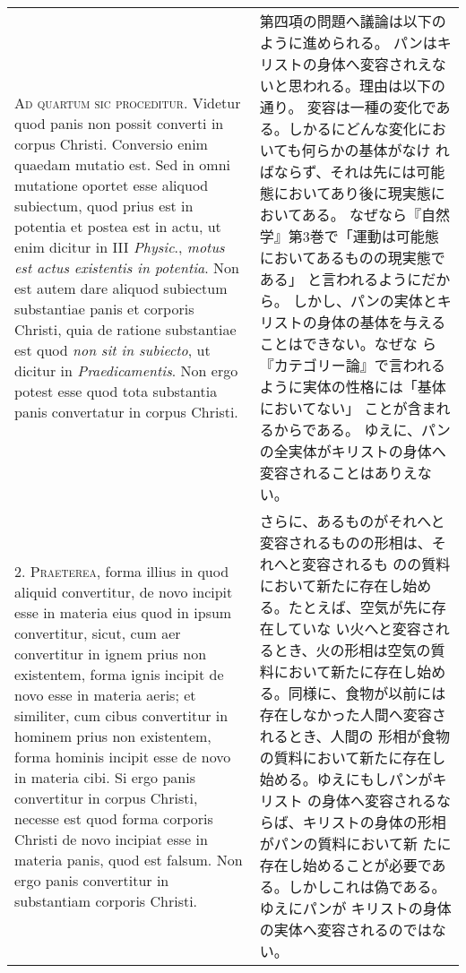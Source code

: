 \documentclass[10pt]{jsarticle} %
\begin{document}
\begin{longtable}{p{21em}p{21em}}

{\scshape Ad quartum sic proceditur}. Videtur quod panis non possit converti in
corpus Christi. Conversio enim quaedam mutatio est. Sed in omni
mutatione oportet esse aliquod subiectum, quod prius est in potentia
et postea est in actu, ut enim dicitur in III {\itshape Physic}., {\itshape motus est actus
existentis in potentia}. Non est autem dare aliquod subiectum
substantiae panis et corporis Christi, quia de ratione substantiae est
quod {\itshape non sit in subiecto}, ut dicitur in {\itshape Praedicamentis}. Non ergo
potest esse quod tota substantia panis convertatur in corpus Christi.

&

第四項の問題へ議論は以下のように進められる。
パンはキリストの身体へ変容されえないと思われる。理由は以下の通り。
変容は一種の変化である。しかるにどんな変化においても何らかの基体がなけ
 ればならず、それは先には可能態においてあり後に現実態においてある。
なぜなら『自然学』第3巻で「運動は可能態においてあるものの現実態である」
 と言われるようにだから。
しかし、パンの実体とキリストの身体の基体を与えることはできない。なぜな
 ら『カテゴリー論』で言われるように実体の性格には「基体においてない」
 ことが含まれるからである。
ゆえに、パンの全実体がキリストの身体へ変容されることはありえない。

\\

2. {\scshape Praeterea}, forma illius in quod aliquid convertitur, de novo incipit
esse in materia eius quod in ipsum convertitur, sicut, cum aer
convertitur in ignem prius non existentem, forma ignis incipit de novo
esse in materia aeris; et similiter, cum cibus convertitur in hominem
prius non existentem, forma hominis incipit esse de novo in materia
cibi. Si ergo panis convertitur in corpus Christi, necesse est quod
forma corporis Christi de novo incipiat esse in materia panis, quod
est falsum. Non ergo panis convertitur in substantiam corporis
Christi.

&

さらに、あるものがそれへと変容されるものの形相は、それへと変容されるも
 のの質料において新たに存在し始める。たとえば、空気が先に存在していな
 い火へと変容されるとき、火の形相は空気の質料において新たに存在し始め
 る。同様に、食物が以前には存在しなかった人間へ変容されるとき、人間の
 形相が食物の質料において新たに存在し始める。ゆえにもしパンがキリスト
 の身体へ変容されるならば、キリストの身体の形相がパンの質料において新
 たに存在し始めることが必要である。しかしこれは偽である。ゆえにパンが
 キリストの身体の実体へ変容されるのではない。


\end{longtable}
\end{document}
